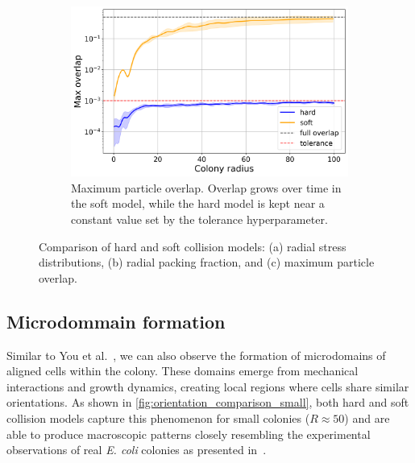 \documentclass[conference]{IEEEtran}
\begin{document}
\begin{figure}[H]
    \vspace{0.5em}

    \begin{subfigure}[b]{\linewidth}
        \centering
        \includegraphics[width=\linewidth]{figures/comparison_plots/combined_colony_radius_vs_max_overlap_with_lines.png}
        \caption{Maximum particle overlap. Overlap grows over time in the soft model, while the hard model is kept near a constant value set by the tolerance hyperparameter.}
        \label{fig:max_overlap_simulation}
    \end{subfigure}

    \caption{Comparison of hard and soft collision models: (a) radial stress distributions, (b) radial packing fraction, and (c) maximum particle overlap.}
    \label{fig:comparison_all}
\end{figure}



\subsection{Microdommain formation}


Similar to You et al.~\cite{You2018,You_2021}, we can also observe the formation of microdomains of aligned cells within the colony. These domains emerge from mechanical interactions and growth dynamics, creating local regions where cells share similar orientations. As shown in \autoref{fig:orientation_comparison_small}, both hard and soft collision models capture this phenomenon for small colonies ($R \approx 50$) and are able to produce macroscopic patterns closely resembling the experimental observations of real \textit{E. coli} colonies as presented in~\cite{You2018}.
\end{document}
